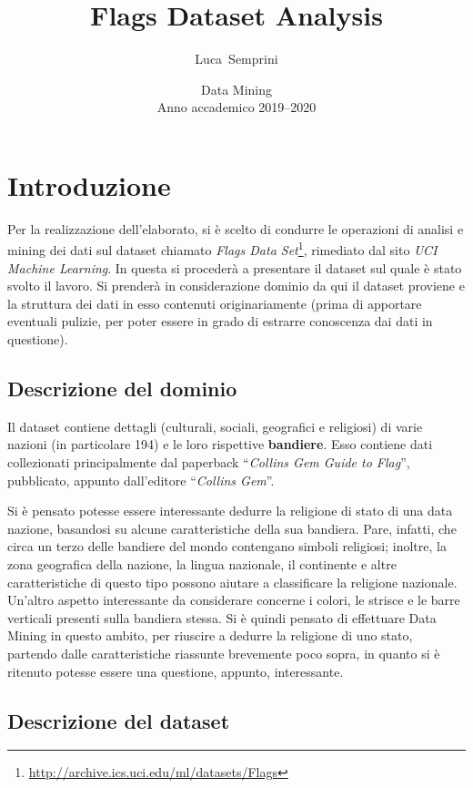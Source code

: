 \documentclass[a4paper,11pt,twoside,notitlepage,final]{scrartcl}
\title{\LARGE{\textbf{Flags Dataset Analysis}}}
\author{Luca~Semprini}
\date{%
  \small{Data Mining}\\%
  \small{Anno accademico 2019--2020}
}
\begin{document}
\maketitle

\section{Introduzione}\label{sec:intro}

Per la realizzazione dell'elaborato, si è scelto di condurre le operazioni di analisi e mining dei dati sul dataset chiamato \emph{Flags Data Set}\footnote{\url{http://archive.ics.uci.edu/ml/datasets/Flags}}, rimediato dal sito \emph{UCI Machine Learning}.
In questa  si procederà a presentare il dataset sul quale è stato svolto il lavoro.
Si prenderà in considerazione dominio da qui il dataset proviene e la struttura dei dati in esso contenuti originariamente (prima di apportare eventuali pulizie, per poter essere in grado di estrarre conoscenza dai dati in questione).

\subsection{Descrizione del dominio}\label{subsec:intro:descrdom}

Il dataset contiene dettagli (culturali, sociali, geografici e religiosi) di varie nazioni (in particolare 194) e le loro rispettive \textbf{bandiere}.
Esso contiene dati collezionati principalmente dal paperback
 ``\emph{Collins Gem Guide to Flag}'', pubblicato, appunto dall'editore ``\emph{Collins Gem}''.

Si è pensato potesse essere interessante dedurre la religione di stato di una data nazione, basandosi su alcune caratteristiche della sua bandiera.
Pare, infatti, che circa un terzo delle bandiere del mondo contengano simboli religiosi; inoltre, la zona geografica della nazione, la lingua nazionale, il continente e altre caratteristiche di questo tipo possono aiutare a classificare la religione nazionale.
Un'altro aspetto interessante da considerare concerne i colori, le strisce e le barre verticali presenti sulla bandiera stessa.
Si è quindi pensato di effettuare Data Mining in questo ambito, per riuscire a dedurre la religione di uno stato, partendo dalle caratteristiche riassunte brevemente poco sopra, in quanto si è ritenuto potesse essere una questione, appunto, interessante.


\subsection{Descrizione del dataset}\label{subsec:intro:descrdata}
\end{document}
